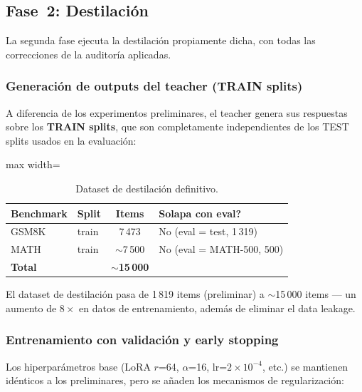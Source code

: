 \documentclass[11pt,a4paper]{article}
\begin{document}
\subsection{Fase~2: Destilaci\'on}

La segunda fase ejecuta la destilaci\'on propiamente dicha, con todas
las correcciones de la auditor\'ia aplicadas.

\subsubsection{Generaci\'on de outputs del teacher (TRAIN splits)}

A diferencia de los experimentos preliminares, el teacher genera sus
respuestas sobre los \textbf{TRAIN splits}, que son completamente
independientes de los TEST splits usados en la evaluaci\'on:

\begin{table}[H]
\centering
\caption{Dataset de destilaci\'on definitivo.}
\label{tab:distill-dataset}
\begin{adjustbox}{max width=\textwidth}
\begin{tabular}{@{}llcl@{}}
\toprule
\textbf{Benchmark} & \textbf{Split} & \textbf{Items}
  & \textbf{\textquestiondown{}Solapa con eval?} \\
\midrule
GSM8K  & train & 7\,473          & No (eval = test, 1\,319) \\
MATH   & train & $\sim$7\,500    & No (eval = MATH-500, 500) \\
\midrule
\textbf{Total} & & \textbf{$\sim$15\,000} & \\
\bottomrule
\end{tabular}
\end{adjustbox}
\end{table}

El dataset de destilaci\'on pasa de 1\,819 items (preliminar) a
$\sim$15\,000 items --- un aumento de $8\times$ en datos de
entrenamiento, adem\'as de eliminar el data leakage.

\subsubsection{Entrenamiento con validaci\'on y early stopping}

Los hiperpar\'ametros base (LoRA $r$=64, $\alpha$=16, lr=$2 \times
10^{-4}$, etc.) se mantienen id\'enticos a los preliminares, pero
se a\~naden los mecanismos de regularizaci\'on:
\end{document}
